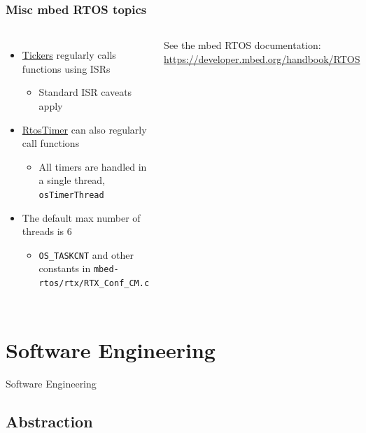 \documentclass{beamer}
\begin{document}
\begin{frame}
\frametitle{Misc mbed RTOS topics}
\begin{columns}[t]
\begin{itemize}
  \item \href{https://developer.mbed.org/handbook/Ticker}{Tickers} regularly calls functions using ISRs
  \begin{itemize}
    \item Standard ISR caveats apply
  \end{itemize}
  \item \href{https://developer.mbed.org/handbook/RTOS}{RtosTimer} can also regularly call functions
  \begin{itemize}
    \item All timers are handled in a single thread, \texttt{osTimerThread}
  \end{itemize}
  \item The default max number of threads is 6
  \begin{itemize}
    \item \texttt{OS\_TASKCNT} and other constants in \texttt{mbed-rtos/rtx/RTX\_Conf\_CM.c}
  \end{itemize}
\end{itemize}
\vspace{5px}
See the mbed RTOS documentation: \\
{\scriptsize\url{https://developer.mbed.org/handbook/RTOS}} \\


\end{columns}
\end{frame}


\section{Software Engineering} %
\begin{frame}
\centering \huge Software Engineering
\end{frame}

\subsection{Abstraction}
\end{document}
